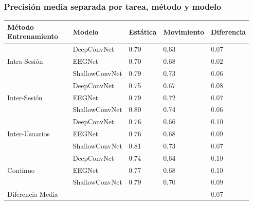 \subsubsection{Precisión media separada por tarea, método y modelo}

\begin{table}[!ht]
  \centering
  \begin{tabular}{|l|l|l|l|l|}
    \hline
    Método Entrenamiento              & Modelo         & Estática & Movimiento & Diferencia \\ \hline
    \multirow{3}{6em}{Intra-Sesión}   & DeepConvNet    & 0.70     & 0.63       & 0.07       \\ \cline{2-5}
                                      & EEGNet         & 0.70     & 0.68       & 0.02       \\ \cline{2-5}
                                      & ShallowConvNet & 0.79     & 0.73       & 0.06       \\ \hline
    \multirow{3}{6em}{Inter-Sesión}   & DeepConvNet    & 0.75     & 0.67       & 0.08       \\ \cline{2-5}
                                      & EEGNet         & 0.79     & 0.72       & 0.07       \\ \cline{2-5}
                                      & ShallowConvNet & 0.80     & 0.74       & 0.06       \\ \hline
    \multirow{3}{7em}{Inter-Usuarios} & DeepConvNet    & 0.76     & 0.66       & 0.10       \\ \cline{2-5}
                                      & EEGNet         & 0.76     & 0.68       & 0.09       \\ \cline{2-5}
                                      & ShallowConvNet & 0.81     & 0.73       & 0.07       \\ \hline
    \multirow{3}{6em}{Continuo}       & DeepConvNet    & 0.74     & 0.64       & 0.10       \\ \cline{2-5}
                                      & EEGNet         & 0.77     & 0.68       & 0.10       \\ \cline{2-5}
                                      & ShallowConvNet & 0.79     & 0.70       & 0.09       \\ \hline
    Diferencia Media                  &                &          &            & 0.07       \\ \hline
  \end{tabular}
\end{table}

